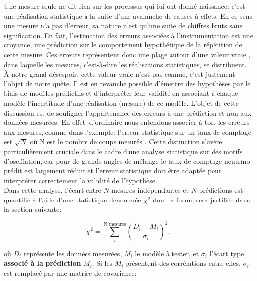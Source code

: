 Une mesure seule ne dit rien sur les processus qui lui ont donné naissance: c'est une réalisation statistique à la suite d'une avalanche de causes à effets. En ce sens une mesure n'a pas d'erreur, sa nature n'est qu'une suite de chiffres bruts sans signification. En fait, l'estimation des erreurs associées à l'instrumentation est une croyance, une prédiction sur le comportement hypothétique de la répétition de cette mesure. Ces erreurs représentent donc une plage autour d'une \og valeur vraie \fg{}, dans laquelle les mesures, c'est-à-dire les réalisations statistiques, se distribuent. À notre grand désespoir, cette valeur vraie n'est pas connue, c'est justement l'objet de notre quête. Il est en revanche possible d'émettre des hypothèses par le biais de modèles prédictifs et d'interpréter leur validité en associant à chaque modèle l'incertitude d'une réalisation (mesure) de ce modèle. L'objet de cette discussion est de souligner l'appartenance des erreurs à une prédiction et non aux données mesurées. En effet, d'ordinaire nous entendons associer à tort les erreurs aux mesures, comme dans l'exemple: \og l'erreur statistique sur un taux de comptage est $\sqrt{N}$ où N est le nombre de coups mesurés \fg{}. Cette distinction s'avère particulièrement cruciale dans le cadre d'une analyse statistique sur des motifs d'oscillation, car pour de grands angles de mélange le taux de comptage neutrino prédit est largement réduit et l'erreur statistique doit être adaptée pour interpréter correctement la validité de l'hypothèse.\\


Dans cette analyse, l'écart entre $N$ mesures indépendantes et $N$ prédictions est quantifié à l'aide d'une statistique dénommée $\chi^2$ dont la forme sera justifiée dans la section suivante:

\begin{equation}
\label{eq:basic_chi2}
    \chi^2 = \sum_i^\textrm{N mesures} \left( \frac{D_i - M_i}{\sigma_i} \right)^2,
\end{equation}

\bigbreak

où $D_i$ représente les données mesurées, $M_i$ le modèle à tester, et $\sigma_i$ l'écart type \textbf{associé à la prédiction $M_i$}. Si les $M_i$ présentent des corrélations entre elles, $\sigma_i$ est remplacé par une matrice de covariance:

